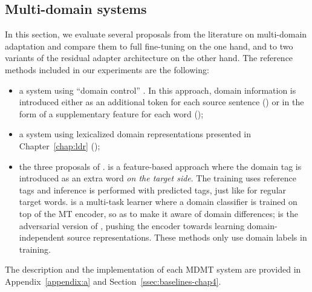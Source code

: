 \subsection{Multi-domain systems}
In this section, we evaluate several proposals from the literature on multi-domain adaptation and compare them to full fine-tuning on the one hand, and to two variants of the residual adapter architecture on the other hand.
The reference methods included in our experiments are the following:
\begin{itemize}
\item a system using ``domain control'' \citep{Kobus17domain}. In this approach, domain information is introduced either as an additional token for each source sentence () or in the form of a supplementary feature for each word ();
\item a system using lexicalized domain representations presented in Chapter~\ref{chap:ldr} ();
\item the three proposals of \citet{Britz17effective}.  is a feature-based approach where the domain tag is introduced as an extra word \textsl{on the target side}. The training uses reference tags and inference is performed with predicted tags, just like for regular target words.  is a multi-task learner where a domain classifier is trained on top of the MT encoder, so as to make it aware of domain differences;  is the adversarial version of , pushing the encoder towards learning domain-independent source representations. These methods only use domain labels in training.
\end{itemize}
The description and the implementation of each MDMT system are provided in Appendix~\ref{appendix:a} and Section~\ref{ssec:baselines-chap4}.
